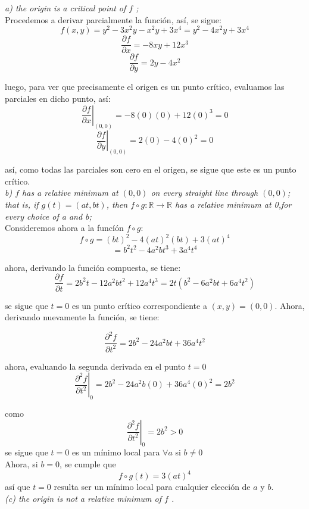 \documentclass[a4paper,12pt]{article}
\begin{document}
	\textit{a) the origin is a critical point of $f$ ;}\\

	Procedemos a derivar parcialmente la función, así, se sigue:
	$$f(x,y) = y^2 -3x^2y -x^2y + 3x^4 = y^2 -4x^2y + 3x^4  $$
	$$\frac{\partial f}{\partial x} = -8xy + 12x^3 $$
	$$\frac{\partial f}{\partial y} = 2y - 4x^2 $$

	luego, para ver que precisamente el origen es un punto crítico,
	evaluamos las parciales en dicho punto, así:
	$$\left. \frac{\partial f}{\partial x} \right|_{(0,0)}
			= -8(0)(0) + 12(0)^3 = 0 $$
	$$\left. \frac{\partial f}{\partial y} \right|_{(0,0)}
			= 2(0) - 4(0)^2 = 0 $$

	así, como todas las parciales son cero en el origen, se sigue que este es
	un punto crítico.\\

	\textit{b) $f$ has a relative minimum at $(0, 0)$ on every straight line
			through $(0, 0)$; that is, if $g(t) = (at, bt)$, then
			$f \circ g : \mathbb{R} \rightarrow \mathbb{R}$ has a relative
			minimum at 0,for every choice of a and b;}\\

		Consideremos ahora a la funcíón $f \circ g$:
		$$ f \circ g = (bt)^2 - 4(at)^2(bt) + 3(at)^4$$
		$$ = b^2t^2 - 4a^2bt^3 + 3a^4t^4$$

		ahora, derivando la función compuesta, se tiene:
		$$\frac{\partial f}{\partial t} = 2b^2t -12a^2bt^2 + 12a^4t^3
										= 2t(b^2 - 6a^2bt + 6a^4t^2)$$

		se sigue que $t = 0$ es un punto crítico correspondiente a $(x,y) = (0,0)$.
		Ahora, derivando nuevamente la función, se tiene:

		$$\frac{\partial^2 f}{\partial t^2} = 2b^2 -24a^2bt + 36a^4t^2 $$

		ahora, evaluando la segunda derivada en el punto $t = 0$
		$$\left. \frac{\partial^2 f}{\partial t^2} \right|_{0}
			= 2b^2 -24a^2b(0) + 36a^4(0)^2 = 2b^2 $$

		como
			$$\left. \frac{\partial^2 f}{\partial t^2} \right|_{0} = 2b^2 > 0$$
		se sigue que $t = 0$ es un mínimo local para
		$\forall a$ si $b \neq 0$\\

		Ahora, si $b = 0$, se cumple que
			$$f \circ g (t) = 3(at)^4$$
		así que $t = 0$ resulta ser un mínimo local para cualquier elección de
		$a$ y $b$.\\

	\textit{(c) the origin is not a relative minimum of $f$ .}\\
	\newline
\end{document}
